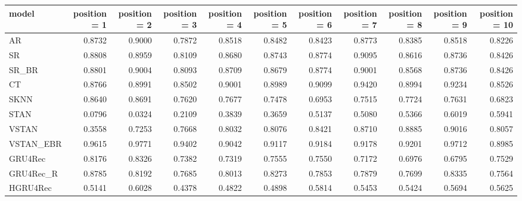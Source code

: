 \begin{tabular}{lrrrrrrrrrr}
\toprule
     model &  position = 1 &  position = 2 &  position = 3 &  position = 4 &  position = 5 &  position = 6 &  position = 7 &  position = 8 &  position = 9 &  position = 10 \\
\midrule
        AR &        0.8732 &        0.9000 &        0.7872 &        0.8518 &        0.8482 &        0.8423 &        0.8773 &        0.8385 &        0.8518 &         0.8226 \\
        SR &        0.8808 &        0.8959 &        0.8109 &        0.8680 &        0.8743 &        0.8774 &        0.9095 &        0.8616 &        0.8736 &         0.8426 \\
     SR\_BR &        0.8801 &        0.9004 &        0.8093 &        0.8709 &        0.8679 &        0.8774 &        0.9001 &        0.8568 &        0.8736 &         0.8426 \\
        CT &        0.8766 &        0.8991 &        0.8502 &        0.9001 &        0.8989 &        0.9099 &        0.9420 &        0.8994 &        0.9234 &         0.8526 \\
      SKNN &        0.8640 &        0.8691 &        0.7620 &        0.7677 &        0.7478 &        0.6953 &        0.7515 &        0.7724 &        0.7631 &         0.6823 \\
      STAN &        0.0796 &        0.0324 &        0.2109 &        0.3839 &        0.3659 &        0.5137 &        0.5080 &        0.5366 &        0.6019 &         0.5941 \\
     VSTAN &        0.3558 &        0.7253 &        0.7668 &        0.8032 &        0.8076 &        0.8421 &        0.8710 &        0.8885 &        0.9016 &         0.8057 \\
 VSTAN\_EBR &        0.9615 &        0.9771 &        0.9402 &        0.9042 &        0.9117 &        0.9184 &        0.9178 &        0.9201 &        0.9712 &         0.8985 \\
   GRU4Rec &        0.8176 &        0.8326 &        0.7382 &        0.7319 &        0.7555 &        0.7550 &        0.7172 &        0.6976 &        0.6795 &         0.7529 \\
 GRU4Rec\_R &        0.8785 &        0.8192 &        0.7685 &        0.8013 &        0.8273 &        0.7853 &        0.7879 &        0.7699 &        0.8335 &         0.7564 \\
  HGRU4Rec &        0.5141 &        0.6028 &        0.4378 &        0.4822 &        0.4898 &        0.5814 &        0.5453 &        0.5424 &        0.5694 &         0.5625 \\
\bottomrule
\end{tabular}
